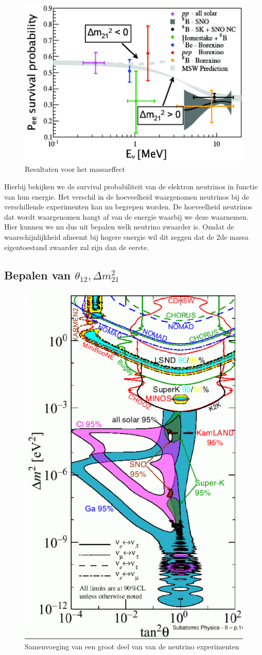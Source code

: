 \documentclass[../main.tex]{subfiles}
\begin{document}
\begin{figure}[h]
    \centering
    \includegraphics[width=0.5\linewidth]{neutrinos/msw_resultaten.png}
    \caption{Resultaten voor het massaeffect}%
    \label{fig:neutrinos/msw_resultaten}
\end{figure}

Hierbij bekijken we de survival probabiliteit van de elektron neutrinos in functie van hun energie. Het verschil in de hoeveelheid waargenomen neutrinos bij de verschillende experimenten kan nu begrepen worden. De hoeveelheid neutrinos dat wordt waargenomen hangt af van de energie waarbij we deze waarnemen. Hier kunnen we nu dus uit bepalen welk neutrino zwaarder is. Omdat de waarschijnlijkheid afneemt bij hogere energie wil dit zeggen dat de 2de massa eigentoestand zwaarder zal zijn dan de eerste.

\subsection{Bepalen van $\theta_{12}, \Delta m_{21}^{2}$}%
\label{sub:bepalen_van_de_parameters}

\begin{figure}[h]
    \centering
    \includegraphics[width=0.6\linewidth]{neutrinos/alle_neutrino_resultaten.png}
    \caption{Samenvoeging van een groot deel van van de neutrino experimenten}%
    \label{fig:neutrinos/alle_neutrino_resultaten}
\end{figure}
\end{document}
